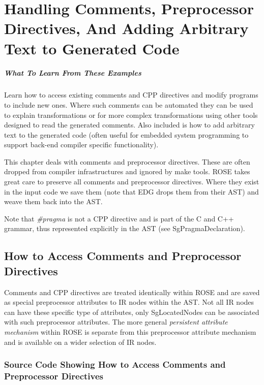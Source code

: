 \chapter{Handling Comments, Preprocessor Directives, And Adding Arbitrary Text to Generated Code}

\paragraph{What To Learn From These Examples}
Learn how to access existing comments and CPP directives
and modify programs to include new ones. Where such comments 
can be automated they can be used to explain transformations 
or for more complex transformations using other tools
designed to read the generated comments.  Also included is
how to add arbitrary text to the generated code (often useful
for embedded system programming to support back-end compiler 
specific functionality).

   This chapter deals with comments and preprocessor directives.
These are often dropped from compiler infrastructures and ignored
by make tools.  ROSE takes great care to preserve all comments and
preprocessor directives.  Where they exist in the input code we 
save them (note that EDG drops them from their AST) and weave them
back into the AST.  

Note that {\it \#pragma} is not a CPP directive and is part of the
C and C++ grammar, thus represented explicitly in the AST (see SgPragmaDeclaration).

\section{How to Access Comments and Preprocessor Directives}

   Comments and CPP directives are treated identically within ROSE and are 
saved as special preprocessor attributes to IR nodes within the AST.
Not all IR nodes can have these specific type of attributes, only 
SgLocatedNodes can be associated with such preprocessor attributes.
The more general {\it persistent attribute mechanism} within ROSE is separate from this
preprocessor attribute mechanism and is available on a wider selection of IR nodes.

\subsection{Source Code Showing How to Access Comments and Preprocessor Directives}

